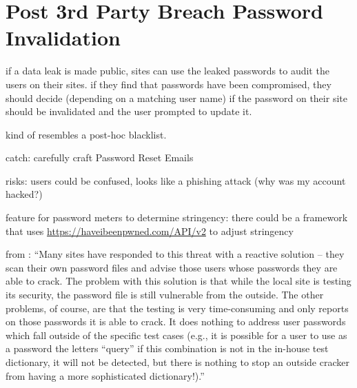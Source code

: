 \section{Post 3rd Party Breach Password Invalidation}
if a data leak is made public, sites can use the leaked passwords to audit the users on their sites. if they find that passwords have been compromised, they should decide (depending on a matching user name) if the password on their site should be invalidated and the user prompted to update it.

kind of resembles a post-hoc blacklist.  

catch: carefully craft Password Reset Emails \cite{Kim2017TooBusy}

risks: users could be confused, looks like a phishing attack (why was my account hacked?)

feature for password meters to determine stringency: 
there could be a framework that uses \url{https://haveibeenpwned.com/API/v2} to adjust stringency 

from \cite{Bishop1995ProactivePasswordChecking}: ``Many sites have responded to this threat with a reactive solution -- they scan their own password files and advise those users whose passwords they are able to crack. The problem with this solution is that while the local site is testing its security, the password file is still vulnerable from the outside. The other problems, of course, are that the testing is very time-consuming and only reports on those passwords it is able to crack. It does nothing to address user passwords which fall outside of the specific test cases (e.g., it is possible for a user to use as a password the letters ``query'' if this combination is not in the in-house test dictionary, it will not be detected, but there is nothing to stop an outside cracker from having a more sophisticated dictionary!).''
